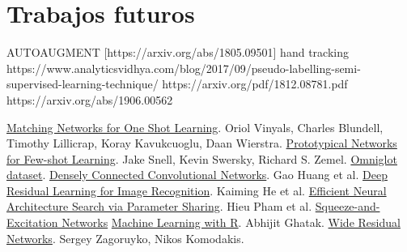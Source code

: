 \documentclass[runningheads,a4paper]{llncs}
\begin{document}
\section{Trabajos futuros}
AUTOAUGMENT [https://arxiv.org/abs/1805.09501]
hand tracking
https://www.analyticsvidhya.com/blog/2017/09/pseudo-labelling-semi-supervised-learning-technique/
https://arxiv.org/pdf/1812.08781.pdf
https://arxiv.org/abs/1906.00562

\begin{thebibliography}{4}
     \href{https://arxiv.org/abs/1606.04080}{Matching Networks for One Shot Learning}. Oriol Vinyals, Charles Blundell, Timothy Lillicrap, Koray Kavukcuoglu, Daan Wierstra.
     \href{https://arxiv.org/abs/1703.05175}{Prototypical Networks for Few-shot Learning}. Jake Snell, Kevin Swersky, Richard S. Zemel.
     \href{https://github.com/brendenlake/omniglot}{Omniglot dataset}.
     \href{https://arxiv.org/pdf/1608.06993.pdf}{Densely Connected Convolutional Networks}. Gao Huang et al.
     \href{https://arxiv.org/pdf/1512.03385.pdf}{Deep Residual Learning for Image Recognition}. Kaiming He et al.
     \href{https://arxiv.org/pdf/1802.03268.pdf}{Efficient Neural Architecture Search via Parameter Sharing}. Hieu Pham et al.
     \href{https://arxiv.org/pdf/1709.01507.pdf}{Squeeze-and-Excitation Networks}
     \href{https://books.google.com.ar/books?id=rERADwAAQBAJ&pg=PA64&lpg=PA64&dq=Variance+is+the+algorithm\%E2\%80\%99s+tendency+to+learn+random+things+irrespective+of+the+real+signal+by+fitting+highly+flexible+models+that+follow+the+error&source=bl&ots=raekkRHUoA&sig=ACfU3U0m3wuVS6hW9WDDsq4SGP8rSDK6Fg&hl=es-419&sa=X&ved=2ahUKEwjw8Z73q4rjAhVvD7kGHa4jDnwQ6AEwBXoECAkQAQ#v=onepage&q&f=false}{Machine Learning with R}. Abhijit Ghatak.
    \href{https://arxiv.org/pdf/1605.07146.pdf}{Wide Residual Networks}. Sergey Zagoruyko, Nikos Komodakis.
\end{thebibliography}
\end{document}
